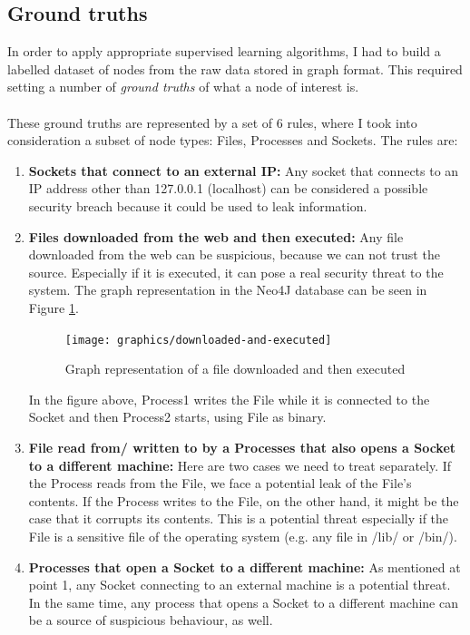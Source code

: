 	\subsection{Ground truths} \label{Section: prep/data/ground-truths}
	In order to apply appropriate supervised learning algorithms, I had to build a labelled dataset of nodes from the raw data stored in graph format. This required setting a number of \textit{ground truths} of what a node of interest is. 
	\\ \\
	These ground truths are represented by a set of 6 rules, where I took into consideration a subset of node types: Files, Processes and Sockets. The rules are:
	\begin{enumerate}
		
		\item \textbf{Sockets that connect to an external IP: }Any socket that connects to an IP address other than 127.0.0.1 (localhost) can be considered a possible security breach because it could be used to leak information.
		
		\item \textbf{Files downloaded from the web and then executed: }Any file downloaded from the web can be suspicious, because we can not trust the source. Especially if it is executed, it can pose a real security threat to the system. The graph representation in the Neo4J database can be seen in Figure \ref{Figure 2.3}.
		\begin{figure}[H]
			\centering
			\texttt{[image: graphics/downloaded-and-executed]}
			\label{Figure 2.3}
			\caption{Graph representation of a file downloaded and then executed}
		\end{figure}
		In the figure above, Process1 writes the File while it is connected to the Socket and then Process2 starts, using File as binary.
		
		\item \textbf{File read from/ written to by a Processes that also opens a Socket to a different machine: }Here are two cases we need to treat separately. If the Process reads from the File, we face a potential leak of the File's contents. If the Process writes to the File, on the other hand, it might be the case that it corrupts its contents. This is a potential threat especially if the File is a sensitive file of the operating system (e.g. any file in /lib/ or /bin/). 
		
		\item \textbf{Processes that open a Socket to a different machine: }As mentioned at point 1, any Socket connecting to an external machine is a potential threat. In the same time, any process that opens a Socket to a different machine can be a source of suspicious behaviour, as well. 
		

\end{enumerate}
